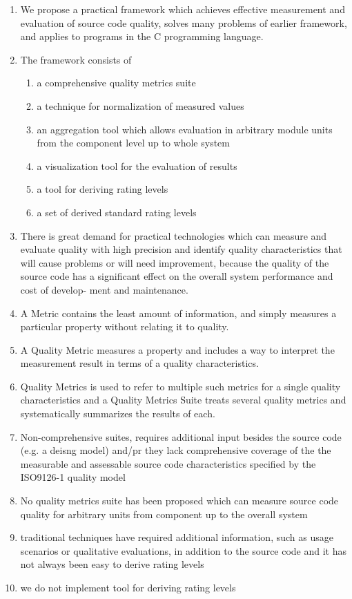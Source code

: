 \begin{enumerate}
    \item We propose a practical framework which achieves effective measurement and evaluation of source code quality, solves many problems of earlier framework, and applies to programs in the C programming language.
    \item The framework consists of 
    \begin{enumerate}
        \item a comprehensive quality metrics suite
        \item a technique for normalization of measured values
        \item an aggregation tool which allows evaluation in arbitrary module units from the component level up to whole system
        \item a visualization tool for the evaluation of results
        \item a tool for deriving rating levels
        \item a set of derived standard rating levels
    \end{enumerate}
    \item There is great demand for practical technologies which can measure and evaluate quality with high precision and identify quality characteristics that will cause problems or will need improvement, because the quality of the source code has a significant effect on the overall system performance and cost of develop- ment and maintenance. 
    \item A Metric contains the least amount of information, and simply measures a particular property without relating it to quality. 
    \item A Quality Metric measures a property and includes a way to interpret the measurement result in terms of a quality characteristics. 
    \item Quality Metrics is used to refer to multiple such metrics for a single quality characteristics and a Quality Metrics Suite treats several quality metrics and systematically summarizes the results of each.
    \item Non-comprehensive suites, requires additional input besides the source code (e.g. a deisng model) and/pr they lack comprehensive coverage of the the measurable and assessable source code characteristics specified by the ISO9126-1 quality model
    \item No quality metrics suite has been proposed which can measure source code quality for arbitrary units from component up to the overall system
    \item traditional techniques have required additional information, such as usage scenarios or qualitative evaluations, in addition to the source code and it has not always been easy to derive rating levels
    \item we do not implement tool for deriving rating levels
    
\end{enumerate}

